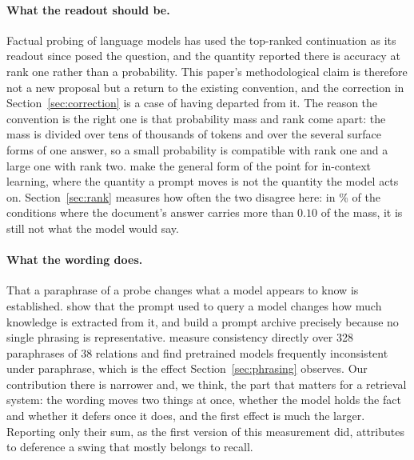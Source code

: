 \documentclass{article}
\begin{document}
\paragraph{What the readout should be.}
Factual probing of language models has used the top-ranked continuation as
its readout since \citet{petroni2019lama} posed the question, and the
quantity reported there is accuracy at rank one rather than a probability.
This paper's methodological claim is therefore not a new proposal but a
return to the existing convention, and the correction in
Section~\ref{sec:correction} is a case of having departed from it. The
reason the convention is the right one is that probability mass and rank
come apart: the mass is divided over tens of thousands of tokens and over
the several surface forms of one answer, so a small probability is
compatible with rank one and a large one with rank two.
\citet{min2022rethinking} make the general form of the point for in-context
learning, where the quantity a prompt moves is not the quantity the model
acts on. Section~\ref{sec:rank} measures how often the two disagree here:
in \ProbOverTenNotTopPct\% of the conditions where the document's answer
carries more than $0.10$ of the mass, it is still not what the model would
say.

\paragraph{What the wording does.}
That a paraphrase of a probe changes what a model appears to know is
established. \citet{jiang2020know} show that the prompt used to query a
model changes how much knowledge is extracted from it, and build a prompt
archive precisely because no single phrasing is representative.
\citet{elazar2021consistency} measure consistency directly over 328
paraphrases of 38 relations and find pretrained models frequently
inconsistent under paraphrase, which is the effect Section~\ref{sec:phrasing}
observes. Our contribution there is narrower and, we think, the part that
matters for a retrieval system: the wording moves two things at once, whether
the model holds the fact and whether it defers once it does, and the first
effect is much the larger. Reporting only their sum, as the first version of
this measurement did, attributes to deference a swing that mostly belongs to
recall.
\end{document}
